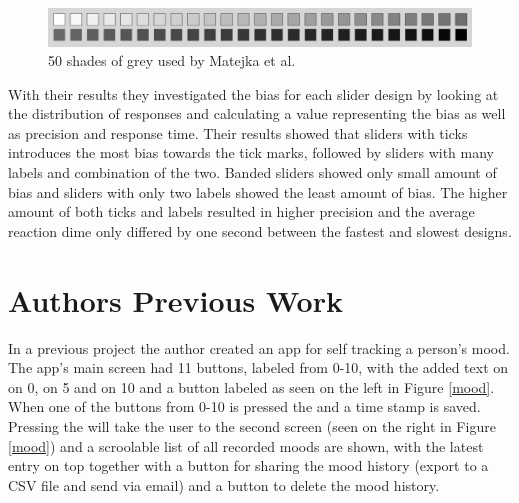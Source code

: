 \begin{figure}[h!]
    \centering
    \includegraphics[width=1\textwidth]{figures/50shades.png}
    \caption{50 shades of grey used by Matejka et al.\cite{grey}}
    \label{50shades}
\end{figure}

With their results they investigated the bias for each slider design by looking at the distribution of responses and calculating a  value representing the bias as well as precision and response time. Their results showed that sliders with ticks introduces the most bias towards the tick marks, followed by sliders with many labels and combination of the two. Banded sliders showed only small amount of bias and sliders with only two labels showed the least amount of bias. The higher amount of both ticks and labels resulted in higher precision and the average reaction dime only differed by one second between the fastest and slowest designs.







\section{Authors Previous Work}
In a previous project the author created an app for self tracking a person's mood\cite{mood}. The app's main screen had 11 buttons, labeled from 0-10, with the added text on  on 0,  on 5 and  on 10 and a button labeled  as seen on the left in Figure \ref{mood}. When one of the buttons from 0-10 is pressed the  and a time stamp is saved. Pressing the  will take the user to the second screen (seen on the right in Figure \ref{mood}) and a scroolable list of all recorded moods are shown, with the latest entry on top together with a button for sharing the mood history (export to a CSV file and send via email) and a button to delete the mood history.

